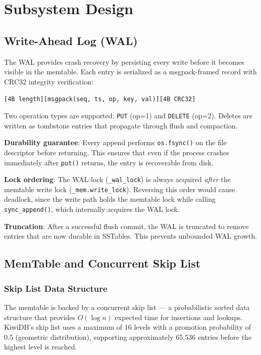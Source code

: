 \documentclass[conference]{IEEEtran}
\begin{document}
\section{Subsystem Design}
\label{sec:design}

\subsection{Write-Ahead Log (WAL)}

The WAL provides crash recovery by persisting every write before it becomes visible in the memtable. Each entry is serialized as a msgpack-framed record with CRC32 integrity verification:

\begin{center}
\texttt{[4B length][msgpack(seq, ts, op, key, val)][4B CRC32]}
\end{center}

Two operation types are supported: \texttt{PUT} (op=1) and \texttt{DELETE} (op=2). Deletes are written as tombstone entries that propagate through flush and compaction.

\textbf{Durability guarantee}: Every append performs \texttt{os.fsync()} on the file descriptor before returning. This ensures that even if the process crashes immediately after \texttt{put()} returns, the entry is recoverable from disk.

\textbf{Lock ordering}: The WAL lock (\texttt{\_wal\_lock}) is always acquired \emph{after} the memtable write lock (\texttt{\_mem.write\_lock}). Reversing this order would cause deadlock, since the write path holds the memtable lock while calling \texttt{sync\_append()}, which internally acquires the WAL lock.

\textbf{Truncation}: After a successful flush commit, the WAL is truncated to remove entries that are now durable in SSTables. This prevents unbounded WAL growth.

\subsection{MemTable and Concurrent Skip List}

\subsubsection{Skip List Data Structure}

The memtable is backed by a concurrent skip list --- a probabilistic sorted data structure that provides $O(\log n)$ expected time for insertions and lookups. KiwiDB's skip list uses a maximum of 16 levels with a promotion probability of 0.5 (geometric distribution), supporting approximately 65,536 entries before the highest level is reached.
\end{document}

